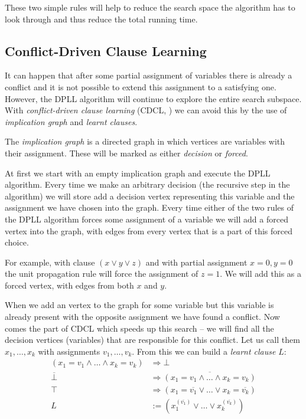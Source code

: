 These two simple rules will help to reduce the search space the algorithm has to look through and thus reduce the total running time.

\subsection{Conflict-Driven Clause Learning}

It can happen that after some partial assignment of variables there is already a conflict and it is not possible to extend this assignment to a satisfying one.
However, the DPLL algorithm will continue to explore the entire search subspace.
With \emph{conflict-driven clause learning} (CDCL, \citep{bayardo1997using,marques1999grasp}) we can avoid this by the use of \emph{implication graph} and \emph{learnt clauses}.

The \emph{implication graph} is a directed graph in which vertices are variables with their assignment.
These will be marked as either \emph{decision} or \emph{forced}.

At first we start with an empty implication graph and execute the DPLL algorithm.
Every time we make an arbitrary decision (the recursive step in the algorithm) we will store add a decision vertex representing this variable and the assignment we have chosen into the graph.
Every time either of the two rules of the DPLL algorithm forces some assignment of a variable we will add a forced vertex into the graph, with edges from every vertex that is a part of this forced choice.

For example, with clause $(x \lor y \lor z)$ and with partial assignment $x=0, y=0$ the unit propagation rule will force the assignment of $z=1$.
We will add this as a forced vertex, with edges from both $x$ and $y$.

When we add an vertex to the graph for some variable but this variable is already present with the opposite assignment we have found a conflict.
Now comes the part of CDCL which speeds up this search -- we will find all the decision vertices (variables) that are responsible for this conflict.
Let us call them $x_1, \dots, x_k$ with assignments $v_1, \dots, v_k$.
From this we can build a \emph{learnt clause} $L$:
\begin{align*}
(x_1 = v_1 \land \dots \land x_k = v_k) &\Rightarrow \bot \\
\overline{\bot} &\Rightarrow \overline{(x_1 = v_1 \land \dots \land x_k = v_k)} \\
\top &\Rightarrow (x_1 = \overline{v_1} \lor \dots \lor x_k = \overline{v_k}) \\
L &:= (x_1^{(\overline{v_1})} \lor \dots \lor x_k^{(\overline{v_k})})
\end{align*}

